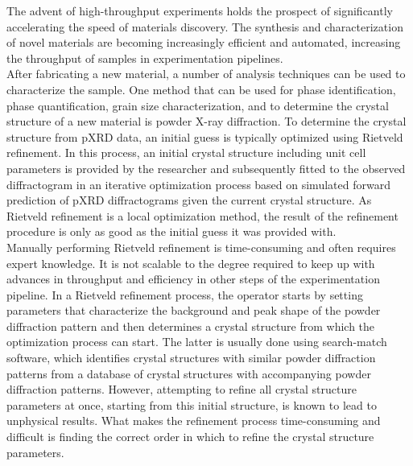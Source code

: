 The advent of high-throughput experiments holds the prospect of significantly accelerating the speed of materials discovery\cite{Liu2019}. The synthesis and characterization of novel materials are becoming increasingly efficient and automated, increasing the throughput of samples in experimentation pipelines\cite{MacLeod2019, Ludwig2019, Ozaki2020}. \\

After fabricating a new material, a number of analysis techniques can be used to characterize the sample. One method that can be used for phase identification, phase quantification, grain size characterization, and to determine the crystal structure of a new material is powder X-ray diffraction. To determine the crystal structure from pXRD data, an initial guess is typically optimized using Rietveld refinement. In this process, an initial crystal structure including unit cell parameters is provided by the researcher and subsequently fitted to the observed diffractogram in an iterative optimization process based on simulated forward prediction of pXRD diffractograms given the current crystal structure\cite{Dinnebier2019, Cano2021}. As Rietveld refinement is a local optimization method, the result of the refinement procedure is only as good as the initial guess it was provided with. \\

Manually performing Rietveld refinement is time-consuming and often requires expert knowledge. It is not scalable to the degree required to keep up with advances in throughput and efficiency in other steps of the experimentation pipeline. In a Rietveld refinement process, the operator starts by setting parameters that characterize the background and peak shape of the powder diffraction pattern and then determines a crystal structure from which the optimization process can start. The latter is usually done using search-match software, which identifies crystal structures with similar powder diffraction patterns from a database of crystal structures with accompanying powder diffraction patterns. However, attempting to refine all crystal structure parameters at once, starting from this initial structure, is known to lead to unphysical results. What makes the refinement process time-consuming and difficult is finding the correct order in which to refine the crystal structure parameters\cite{Ozaki2020}. \\ %

